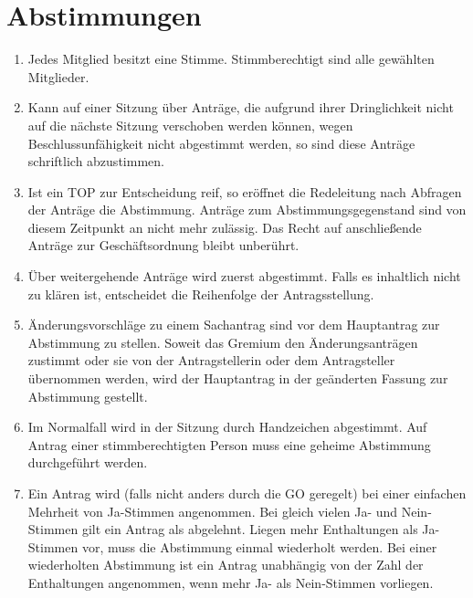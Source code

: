 \section{Abstimmungen}
\label{sec:abstimmungen}
\begin{enumerate}
	\item Jedes Mitglied besitzt eine Stimme.
	Stimmberechtigt sind alle gewählten Mitglieder.
	\item \label{item:Sitzungsbeginn} Kann auf einer Sitzung über Anträge, die aufgrund ihrer Dringlichkeit nicht auf die nächste Sitzung verschoben werden können, wegen Beschlussunfähigkeit nicht abgestimmt werden, so sind diese Anträge schriftlich abzustimmen.
	\item Ist ein TOP zur Entscheidung reif, so eröffnet die Redeleitung nach Abfragen der Anträge die Abstimmung.
	Anträge zum Abstimmungsgegenstand sind von diesem Zeitpunkt an nicht mehr zulässig.
	Das Recht auf anschließende Anträge zur Geschäftsordnung bleibt unberührt.
	\item Über weitergehende Anträge wird zuerst abgestimmt.
	Falls es inhaltlich nicht zu klären ist, entscheidet die Reihenfolge der Antragsstellung.
	\item Änderungsvorschläge zu einem Sachantrag sind vor dem Hauptantrag zur Abstimmung zu stellen.
	Soweit das Gremium den Änderungsanträgen zustimmt oder sie von der Antragstellerin oder dem Antragsteller übernommen werden, wird der Hauptantrag in der geänderten Fassung zur Abstimmung gestellt.
	\item Im Normalfall wird in der Sitzung durch Handzeichen abgestimmt.
	Auf Antrag einer stimmberechtigten Person muss eine geheime Abstimmung durchgeführt werden.
	\item Ein Antrag wird (falls nicht anders durch die GO geregelt) bei einer einfachen Mehrheit von Ja-Stimmen angenommen.
	Bei gleich vielen Ja- und Nein-Stimmen gilt ein Antrag als abgelehnt.
	Liegen mehr Enthaltungen als Ja-Stimmen vor, muss die Abstimmung einmal wiederholt werden.
	Bei einer wiederholten Abstimmung ist ein Antrag unabhängig von der Zahl der Enthaltungen angenommen, wenn mehr Ja- als Nein-Stimmen vorliegen.
	\label{item:abstimmungsmodus}
\end{enumerate}


